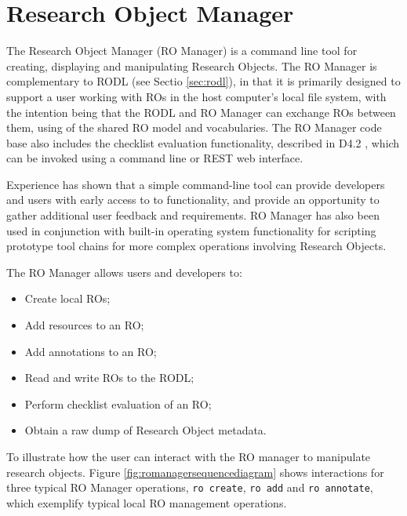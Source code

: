 \section{Research Object Manager}
\label{sec:romanager}


The Research Object Manager (RO Manager) is a command line tool for creating, displaying and manipulating Research Objects. The RO Manager is complementary to RODL (see Sectio \ref{sec:rodl}), in that it is primarily designed to support a user working with ROs in the host computer's local file system, with the intention being that the RODL and RO Manager can exchange ROs between them, using of the shared RO model and vocabularies.  The RO Manager code base also includes the checklist evaluation functionality, described in D4.2 \cite{?}, which can be invoked using a command line or REST web interface.

Experience has shown that a simple command-line tool can provide developers and users with early access to to functionality, and provide an opportunity to gather additional user feedback and requirements.  RO Manager has also been used in conjunction with built-in operating system functionality for scripting prototype tool chains for more complex operations involving Research Objects.

The RO Manager allows users and developers to:

\begin{itemize}

\item Create local ROs;
\item Add resources to an RO;
\item Add annotations to an RO;
\item Read and write ROs to the RODL;
\item Perform checklist evaluation of an RO;
\item Obtain a raw dump of Research Object metadata.
\end{itemize}

To illustrate how the user can interact with the RO manager to manipulate research objects. Figure \ref{fig:romanagersequencediagram} shows interactions for three typical RO Manager operations, \texttt{ro create}, \texttt{ro add} and
\texttt{ro annotate}, which exemplify typical local RO management operations.

